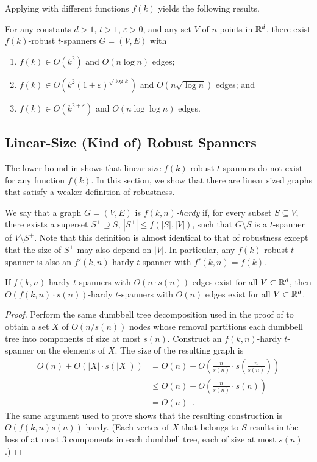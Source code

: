 \documentclass{sig-alternate}
\newcommand{\eps}{\varepsilon}
\begin{document}
Applying  with different functions $f(k)$ yields the
following results.
\begin{cor}
  For any constants $d >1$, $t>1$, $\eps>0$, and any set $V$ of $n$ points
  in $\mathbb{R}^d$, there exist $f(k)$-robust $t$-spanners $G=(V,E)$ with
  \begin{enumerate}
    \item $f(k)\in O(k^2)$ and $O(n\log n)$ edges;
    \item $f(k)\in O(k^2(1+\eps)^{\sqrt{\log k}})$ and $O(n\sqrt{\log n})$
      edges; and
    \item $f(k)\in O(k^{2+\eps})$ and $O(n\log\log n)$ edges.
  \end{enumerate}
\end{cor}



\subsection{Linear-Size (Kind of) Robust Spanners}

The lower bound in  shows that linear-size
$f(k)$-robust $t$-spanners do not exist for any function $f(k)$.  In this
section, we show that there are linear sized graphs that satisfy a weaker
definition of robustness.

We say that a graph $G=(V,E)$ is \emph{$f(k,n)$-hardy} if, for every
subset $S\subseteq V$, there exists a superset $S^+\supseteq S$,
$|S^+|\le f(|S|,|V|)$, such that $G\setminus S$ is a $t$-spanner of
$V\setminus S^+$.  Note that this definition is almost identical to that
of robustness except that the size of $S^+$ may also depend on $|V|$.  In particular, any $f(k)$-robust $t$-spanner is also an $f'(k,n)$-hardy $t$-spanner with $f'(k,n)=f(k)$.

\begin{thm}
  If $f(k,n)$-hardy $t$-spanners with $O(n\cdot s(n))$ edges exist for
  all $V\subset\mathbb{R}^d$, then $O(f(k,n)\cdot s(n))$-hardy $t$-spanners with
  $O(n)$ edges exist for all $V\subset\mathbb{R}^d$.
\end{thm}

\begin{proof}
  Perform the same dumbbell tree decomposition used in the proof of
   to obtain a set $X$ of $O(n/s(n))$ nodes whose removal
  partitions each dumbbell tree into components of size at most $s(n)$.
  Construct an $f(k,n)$-hardy $t$-spanner on the elements of $X$.
  The size of the resulting graph is 
  \begin{align*}
    O(n) + O(|X|\cdot s(|X|)) 
       & = O(n) + O\left(\frac{n}{s(n)}\cdot s\left(\frac{n}{s(n)}\right)\right) \\
       & \le O(n) + O\left(\frac{n}{s(n)}\cdot s(n)\right) \\
       & = O(n) \enspace . 
  \end{align*}
  The same argument used to prove  shows that the resulting
  construction is $O(f(k,n)s(n))$-hardy.  (Each vertex of $X$ that
  belongs to $S$ results in the loss of at most 3 components in each
  dumbbell tree, each of size at most $s(n)$.)
\end{proof}
\end{document}
